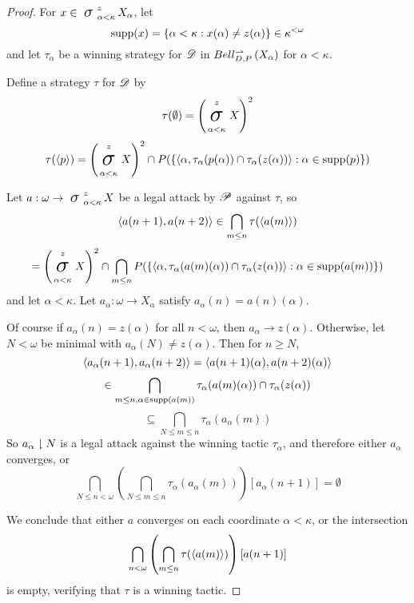 \documentclass{amsart}
\theoremstyle{definition}
\begin{document}
  \begin{proof}
    For \(x\in\sigmaProd_{\alpha<\kappa}^z X_\alpha\), let
      \[
        \textrm{supp}(x)
          =
        \left\{
          \alpha<\kappa
        :
          x(\alpha)\not=z(\alpha)
        \right\}
          \in
        \kappa^{<\omega}
      \]
    and let \(\tau_\alpha\) be a winning strategy for \(\mathscr{D}\) in
    \(Bell_{D,P}^{\rightharpoonup}\left({X_\alpha}\right)\) for \(\alpha<\kappa\).

    Define a strategy \(\tau\) for \(\mathscr{D}\) by
      \[
        \tau(\emptyset)
          =
        \left(\sigmaProd_{\alpha<\kappa}^z X\right)^2
      \]
      \[
        \tau(\<p\>)
          =
        \left(\sigmaProd_{\alpha<\kappa}^z X\right)^2
          \cap
        P(\{
          \<
            \alpha,
            \tau_\alpha(p(\alpha))\cap\tau_\alpha(z(\alpha))
          \>
            :
          \alpha\in\supp(p)
        \})
      \]

    Let \(a:\omega\to \sigmaProd_{\alpha<\kappa}^z X\) be a legal
    attack by \(\mathscr{P}\) against \(\tau\), so
      \[
        \langle a(n+1),a(n+2)\rangle
          \in
        \bigcap_{m\leq n}
        \tau(\langle a(m)\rangle)
      \]
      \[
          =
        \left(\sigmaProd_{\alpha<\kappa}^z X\right)^2
          \cap
        \bigcap_{m\leq n}
        P(\{
          \<
            \alpha,
            \tau_\alpha(a(m)(\alpha))\cap\tau_\alpha(z(\alpha))
          \>
            :
          \alpha\in\supp(a(m))
        \})
      \]
    and let \(\alpha<\kappa\).
    Let \(a_\alpha:\omega\to X_\alpha\) satisfy
    \(a_\alpha(n)=a(n)(\alpha)\).

    Of course if \(a_\alpha(n)=z(\alpha)\) for all \(n<\omega\), then
    \(a_\alpha\to z(\alpha)\).
    Otherwise, let \(N<\omega\) be minimal with \(a_\alpha(N)\not=z(\alpha)\).
    Then for \(n\geq N\),
      \[
        \langle a_\alpha(n+1),a_\alpha(n+2)\rangle
          =
        \langle a(n+1)(\alpha),a(n+2)(\alpha)\rangle
      \]
      \[
          \in
        \bigcap_{m\leq n,\alpha\in\textrm{supp}(a(m))}
        \tau_\alpha(a(m)(\alpha))\cap\tau_\alpha(z(\alpha))
      \]
      \[
          \subseteq
        \bigcap_{N\leq m\leq n}
        \tau_\alpha(a_\alpha(m))
      \]
    So \(a_\alpha\downharpoonright N\) is a legal attack against the
    winning tactic \(\tau_\alpha\), and therefore either
    \(a_\alpha\) converges, or
      \[
        \bigcap_{N\leq n<\omega}
        \left(
          \bigcap_{N\leq m\leq n}
          \tau_\alpha(a_\alpha(m))
        \right)
        [a_\alpha(n+1)]
          =
        \emptyset
      \]

    We conclude that either \(a\) converges on each coordinate
    \(\alpha<\kappa\), or the intersection
      \[
        \bigcap_{n<\omega}
        \left(
          \bigcap_{m\leq n}
          \tau(\langle a(m)\rangle)
        \right)
        [a(n+1)]
      \]
    is empty, verifying that \(\tau\) is a winning tactic.
  \end{proof}
\end{document}
